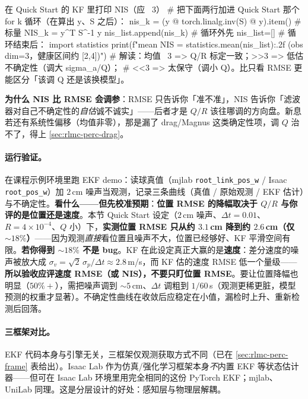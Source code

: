 \begin{codebox}[Python]{在 Quick Start 的 KF 里打印 NIS（应 ~3）}
# 把下面两行加进 Quick Start 那个 for k 循环（在算出 y、S 之后）：
nis_k = (y @ torch.linalg.inv(S) @ y).item()   # 标量 NIS_k = y^T S^-1 y
nis_list.append(nis_k)                          # 循环外先 nis_list=[]
# 循环结束后：
import statistics
print(f"mean NIS = {statistics.mean(nis_list):.2f}  (obs dim=3，健康区间约 [2,4])")
# 解读：均值 ~3 => Q/R 标定一致；>>3 => 低估不确定性（调大 sigma_a/Q）；
#       <<3 => 太保守（调小 Q）。比只看 RMSE 更能区分「该调 Q 还是该换模型」。
\end{codebox}

\noindent\textbf{为什么 NIS 比 RMSE 会调参}：RMSE 只告诉你「准不准」，NIS 告诉你「滤波器对自己不确定性的\emph{自估}诚不诚实」——后者才是 $Q/R$ 该往哪调的方向盘。新息若还有系统性偏移（均值非零），那是漏了 drag/Magnus 这类确定性项，调 $Q$ 治不了，得上 \cref{sec:rlmc-perc-drag}。

\paragraph{运行验证。}在课程示例环境里跑 EKF demo：读球真值（mjlab \verb|root_link_pos_w| / Isaac \verb|root_pos_w|）加 $2$\,cm 噪声当观测，记录三条曲线（真值 / 原始观测 / EKF 估计）与不确定性。\textbf{看什么——但先校准预期}：\textbf{位置 RMSE 的降幅取决于 $Q/R$ 与你评的是位置还是速度}。本节 Quick Start 设定（$2$\,cm 噪声、$\Delta t=0.01$、$R=4\times10^{-4}$、$Q$ 小）下，\textbf{实测位置 RMSE 只从约 $3.1$\,cm 降到约 $2.6$\,cm（仅 $\sim 18\%$）}——因为观测\emph{直接}看位置且噪声不大，位置已经够好、KF 平滑空间有限。\textbf{若你得到 $\sim 18\%$ 不是 bug}。KF 在此设定真正大赢的是\textbf{速度}：差分速度的噪声被放大成 $\sigma_v=\sqrt2\,\sigma_p/\Delta t\approx 2.8$\,m/s，而 KF 估的速度 RMSE 低一个量级——\textbf{所以验收应评速度 RMSE（或 NIS），不要只盯位置 RMSE}。要让位置降幅也明显（$50\%+$），需把噪声调到 $\sim 5$\,cm、$\Delta t$ 调粗到 $1/60$\,s（观测更稀更脏，模型预测的权重才显著）。不确定性曲线在收敛后应稳定在小值，漏检时上升、重新检测后回落。

\paragraph{三框架对比。}EKF 代码本身与引擎无关，三框架仅观测获取方式不同（已在 \cref{sec:rlmc-perc-frame} 表给出）。Isaac Lab 作为仿真/强化学习框架本身\emph{不}内置 EKF 等状态估计器——但可在 Isaac Lab 环境里用完全相同的这份 PyTorch EKF；mjlab、UniLab 同理。这是分层设计的好处：感知层与物理层解耦。

